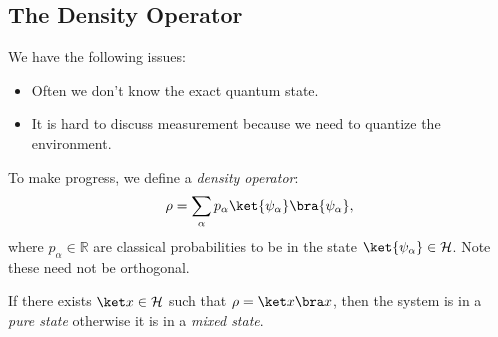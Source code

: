 \documentclass[12pt]{article}
\begin{document}
\subsection{The Density Operator}
\label{sub:den_op}

We have the following issues:
\begin{itemize}
	\item Often we don't know the exact quantum state.
	\item It is hard to discuss measurement because we need to quantize the environment.
\end{itemize}

To make progress, we define a \emph{density operator}:
\[
	\rho = \sum_{\alpha} p_\alpha \ket{\psi_\alpha} \bra{\psi_\alpha},
\]
where $p_\alpha \in \mathbb{R}$ are classical probabilities to be in the state $\ket{\psi_\alpha} \in \mathcal{H}$. Note these need not be orthogonal.

If there exists $\ket x \in \mathcal{H}$ such that $\rho = \ket x \bra x$, then the system is in a \emph{pure state} otherwise it is in a \emph{mixed state}.
\end{document}
